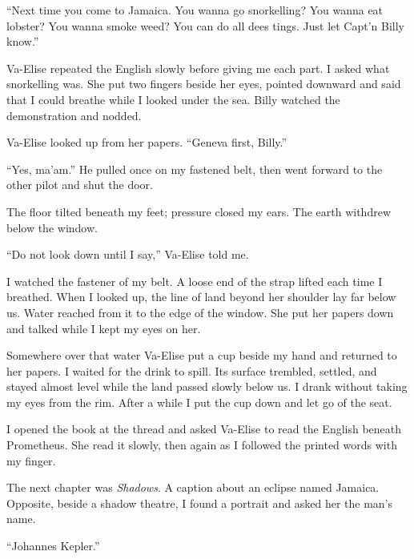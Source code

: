 ``Next time you come to Jamaica. You wanna go snorkelling? You wanna eat lobster? You wanna smoke weed? You can do all dees tings. Just let Capt'n Billy know.''\par

Va-Elise repeated the English slowly before giving me each part. I asked what snorkelling was. She put two fingers beside her eyes, pointed downward and said that I could breathe while I looked under the sea. Billy watched the demonstration and nodded.\par

Va-Elise looked up from her papers. ``Geneva first, Billy.''\par

``Yes, ma'am.'' He pulled once on my fastened belt, then went forward to the other pilot and shut the door.\par

The floor tilted beneath my feet; pressure closed my ears. The earth withdrew below the window.\par

``Do not look down until I say,'' Va-Elise told me.\par

I watched the fastener of my belt. A loose end of the strap lifted each time I breathed. When I looked up, the line of land beyond her shoulder lay far below us. Water reached from it to the edge of the window. She put her papers down and talked while I kept my eyes on her.\par

Somewhere over that water Va-Elise put a cup beside my hand and returned to her papers. I waited for the drink to spill. Its surface trembled, settled, and stayed almost level while the land passed slowly below us. I drank without taking my eyes from the rim. After a while I put the cup down and let go of the seat.\par

I opened the book at the thread and asked Va-Elise to read the English beneath Prometheus. She read it slowly, then again as I followed the printed words with my finger.\par

The next chapter was \textit{Shadows}. A caption about an eclipse named Jamaica. Opposite, beside a shadow theatre, I found a portrait and asked her the man's name.\par

``Johannes Kepler.''\par

